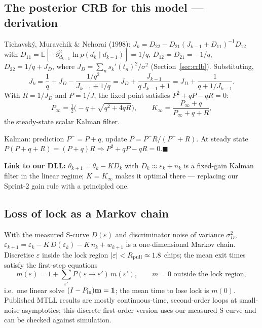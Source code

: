 \documentclass[11pt,a4paper]{article}
\newcommand{\E}{\mathbb{E}}
\begin{document}
\subsection{The posterior CRB for this model --- derivation}
Tichavský, Muravchik \& Nehorai (1998): $J_k=D_{22}-D_{21}(J_{k-1}+D_{11})^{-1}D_{12}$ with
$D_{11}=\E[-\partial^2_{d_{k-1}}\ln p(d_k\mid d_{k-1})]=1/q$, $D_{12}=D_{21}=-1/q$, $D_{22}=1/q+J_D$, where $J_D=\sum_ns_k'(t_n)^2/\sigma^2$
(Section~\ref{sec:crlb}). Substituting,
\begin{equation}
J_k=\frac1q+J_D-\frac{1/q^2}{J_{k-1}+1/q}=J_D+\frac{J_{k-1}}{q\,J_{k-1}+1}=J_D+\frac{1}{q+1/J_{k-1}}.
\end{equation}
With $R=1/J_D$ and $P=1/J$, the fixed point satisfies $P^2+qP-qR=0$:
\begin{equation}
P_\infty=\tfrac12\Big(-q+\sqrt{q^2+4qR}\Big),\qquad K_\infty=\frac{P_\infty+q}{P_\infty+q+R},
\end{equation}
the steady-state scalar Kalman filter.
\begin{proofbox}
Kalman: prediction $P^-=P+q$, update $P=P^-R/(P^-+R)$. At steady state $P(P+q+R)=(P+q)R\Rightarrow P^2+qP-qR=0$.\hfill$\blacksquare$
\end{proofbox}
\textbf{Link to our DLL:} $\theta_{k+1}=\theta_k-KD_k$ with $D_k\approx\varepsilon_k+n_k$ is a fixed-gain Kalman filter in the linear
regime; $K=K_\infty$ makes it optimal there --- replacing our Sprint-2 gain rule with a principled one.

\subsection{Loss of lock as a Markov chain}
With the measured S-curve $D(\varepsilon)$ and discriminator noise of variance $\sigma_D^2$,
$\varepsilon_{k+1}=\varepsilon_k-K\,D(\varepsilon_k)-K\,n_k+w_{k+1}$ is a one-dimensional Markov chain. Discretise $\varepsilon$ inside the
lock region $|\varepsilon|<R_{\rm pull}\approx1.8$ chips; the mean exit times satisfy the first-step equations
\begin{equation}
m(\varepsilon)=1+\sum_{\varepsilon'}P(\varepsilon\to\varepsilon')\,m(\varepsilon'),\qquad m=0\text{ outside the lock region},
\end{equation}
i.e.\ one linear solve $(I-P_{\rm in})\mathbf m=\mathbf 1$; the mean time to lose lock is $m(0)$. Published MTLL results are
mostly continuous-time, second-order loops at small-noise asymptotics; this discrete first-order version uses our measured
S-curve and can be checked against simulation.
\end{document}
